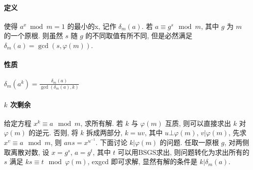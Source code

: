 
\paragraph{定义} 使得 $a^x \bmod m=1$ 的最小的x, 记作 $\delta_m(a)$.
若 $a\equiv g^s \mod m$, 其中 $g$ 为 $m$ 的一个原根.
则虽然 $s$ 随 $g$ 的不同取值有所不同, 但是必然满足 $\delta_m(a)=\gcd(s,\varphi(m))$.
\paragraph{性质} $\delta_m(a^k)=\frac{\delta_m(a)}{\gcd(\delta_m(a),k)}$
\paragraph{$k$ 次剩余} 给定方程 $x^k\equiv a \mod m$, 求所有解.
若 $k$ 与 $\varphi(m)$ 互质, 
则可以直接求出 $k$ 对 $\varphi(m)$ 的逆元.
否则, 将 $k$ 拆成两部分, $k=uv$,
其中 $u\bot \varphi(m)$, $v|\varphi(m)$,
先求 $x^v\equiv a \mod m$,
则 $ans=x^{u^{-1}}$.
下面讨论 $k|\varphi(m)$ 的问题.
任取一原根 $g$, 对两侧取离散对数,
设 $x=g^s$, $a=g^t$, 其中 $t$ 可以用BSGS求出,
则问题转化为求出所有的 $s$ 满足 $ks\equiv t \mod \varphi(m)$,
exgcd 即可求解, 显然有解的条件是 $k|\delta_m(a)$.
